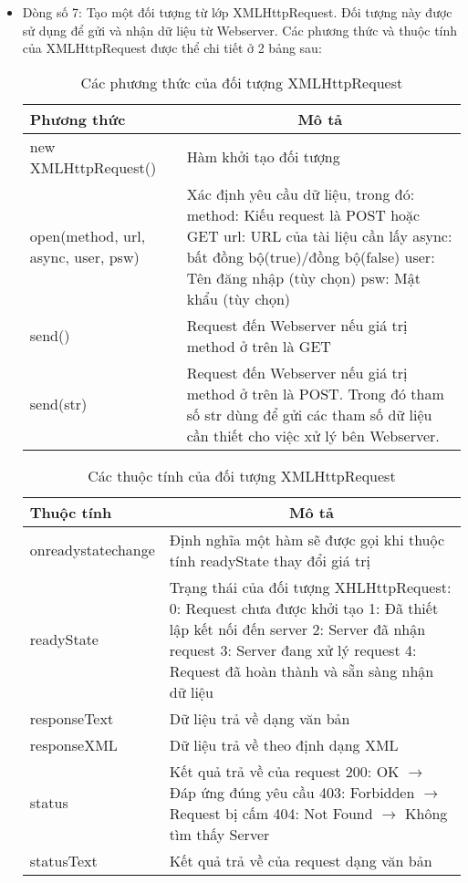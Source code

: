 \begin{itemize}

\item	Dòng số 7: Tạo một đối tượng từ lớp XMLHttpRequest. Đối tượng này được sử dụng để gửi và nhận dữ liệu từ Webserver. Các phương thức và thuộc tính của XMLHttpRequest được thể chi tiết ở 2 bảng sau:

\begin{center}
\begin{longtable}{|m{3cm}|m{9cm}|}
\caption [Các phương thức của đối tượng XMLHttpReques]{Các phương thức của đối tượng XMLHttpRequest}
  \endfirsthead
  \endhead
\hline
\textbf{Phương thức} & \multicolumn{1}{c|}{\textbf{Mô tả}} \\ \hline
new XMLHttpRequest() &	Hàm khởi tạo đối tượng\\ \hline
open(method, url, async, user, psw) &	Xác định yêu cầu dữ liệu, trong đó:
method: Kiếu request là POST hoặc GET
url: URL của tài liệu cần lấy
async: bất đồng bộ(true)/đồng bộ(false)
user: Tên đăng nhập (tùy chọn)
psw: Mật khẩu (tùy chọn) \\ \hline
send()&	Request đến Webserver nếu giá trị method ở trên là GET\\ \hline
send(str) &	Request đến Webserver nếu giá trị method ở trên là POST. Trong đó tham số str dùng để gửi các tham số dữ liệu cần thiết cho việc xử lý bên Webserver. \\ \hline

\end{longtable}
\end{center}
\vspace{-1cm}
\begin{center}
 \begin{longtable}{ |m{3.5cm}|m{8.5cm}| }  
 \caption[Các thuộc tính của đối tượng XMLHttpRequest]{Các thuộc tính của đối tượng XMLHttpRequest}
   \endfirsthead
   \endhead
\hline
\textbf{Thuộc tính} &	\multicolumn{1}{c|}{\textbf{Mô tả}}\\ \hline
onreadystatechange &	Định nghĩa một hàm sẽ được gọi khi thuộc tính readyState thay đổi giá trị\\ \hline
readyState &	Trạng thái của đối tượng XHLHttpRequest:
0: Request chưa được khởi tạo
1:  Đã thiết lập kết nối đến server
2: Server đã nhận request
3: Server đang xử lý request
4: Request đã hoàn thành và sẵn sàng nhận dữ liệu\\ \hline
responseText &	Dữ liệu trả về dạng văn bản\\ \hline
responseXML &	Dữ liệu trả về theo định dạng XML\\ \hline
status &	Kết quả trả về của request
200: OK $ \to $ Đáp ứng đúng yêu cầu
403: Forbidden $ \to $ Request bị cấm
404: Not Found $ \to $ Không tìm thấy Server\\ \hline
statusText &	Kết quả trả về của request dạng văn bản \\ \hline



\end{longtable}
\end{center}
\end{itemize}
